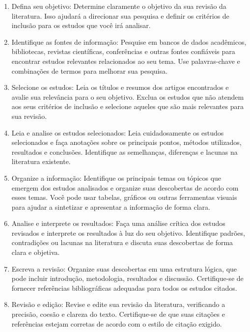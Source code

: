\documentclass[12pt,a4paper, brazil]{article}
\begin{document}
\begin{enumerate}

\item Defina seu objetivo: Determine claramente o objetivo da sua revisão da literatura. Isso ajudará a direcionar sua pesquisa e definir os critérios de inclusão para os estudos que você irá analisar.

\item Identifique as fontes de informação: Pesquise em bancos de dados acadêmicos, bibliotecas, revistas científicas, conferências e outras fontes confiáveis para encontrar estudos relevantes relacionados ao seu tema. Use palavras-chave e combinações de termos para melhorar sua pesquisa.

\item Selecione os estudos: Leia os títulos e resumos dos artigos encontrados e avalie sua relevância para o seu objetivo. Exclua os estudos que não atendem aos seus critérios de inclusão e selecione aqueles que são mais relevantes para sua revisão.

\item Leia e analise os estudos selecionados: Leia cuidadosamente os estudos selecionados e faça anotações sobre os principais pontos, métodos utilizados, resultados e conclusões. Identifique as semelhanças, diferenças e lacunas na literatura existente.

\item Organize a informação: Identifique os principais temas ou tópicos que emergem dos estudos analisados e organize suas descobertas de acordo com esses temas. Você pode usar tabelas, gráficos ou outras ferramentas visuais para ajudar a sintetizar e apresentar a informação de forma clara.

\item Analise e interprete os resultados: Faça uma análise crítica dos estudos revisados e interprete os resultados à luz do seu objetivo. Identifique padrões, contradições ou lacunas na literatura e discuta suas descobertas de forma clara e objetiva.

\item Escreva a revisão: Organize suas descobertas em uma estrutura lógica, que pode incluir introdução, metodologia, resultados e discussão. Certifique-se de fornecer referências bibliográficas adequadas para todos os estudos citados.

\item Revisão e edição: Revise e edite sua revisão da literatura, verificando a precisão, coesão e clareza do texto. Certifique-se de que suas citações e referências estejam corretas de acordo com o estilo de citação exigido.

\end{enumerate}
\end{document}
